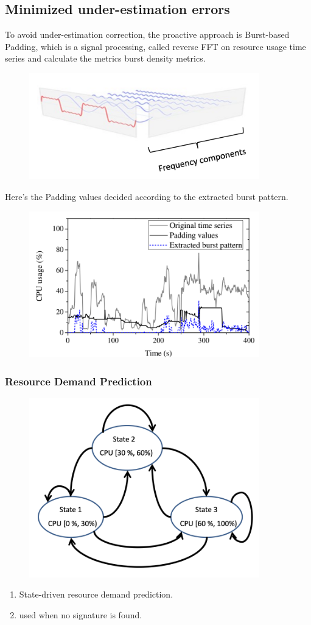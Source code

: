 \documentclass[acmlarge]{acmart}
\begin{document}
\subsection{Minimized under-estimation errors}
To avoid under-estimation correction, the proactive approach is Burst-based Padding, which is a signal processing, called reverse FFT on resource usage time series and calculate the metrics burst density metrics.
\begin{figure}[H]
  \centering
  \includegraphics[width=10cm]{./prediction.png}
\end{figure}
Here's the Padding values decided according to the extracted burst pattern.
\begin{figure}[H]
  \centering
  \includegraphics[width=10cm]{./pattern.png}
\end{figure}
\subsubsection{Resource Demand Prediction}
\begin{figure}[H]
  \centering
  \includegraphics[width=10cm]{./resource_demand.png}
\end{figure}
\begin{enumerate}
  \item State-driven resource demand prediction.
  \item used when no signature is found.
\end{enumerate}
\end{document}
